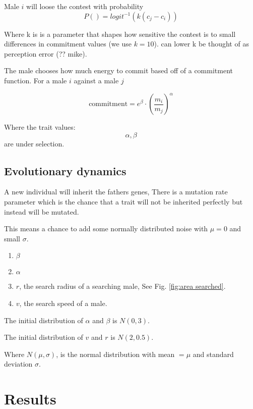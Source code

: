 \documentclass[a4paper,11pt]{article}
\newcommand{\myfigure}[4]{
\begin{figure}[h!]
    \centering
    \texttt{[image: \#1]}
    \caption{#2}
    \centering
    \texttt{[image: \#3]}
    \caption{#4}
\end{figure}
}
\begin{document}
Male $i$ will loose the contest with probability 
$$P(\text{})= logit^{-1}(k(c_j - c_i))$$

Where k is is a parameter that shapes how sensitive the contest is to small differences in commitment values (we use $k = 10$).
can lower k be thought of as perception error (?? mike).

The male chooses how much energy to commit based off of a commitment function. For a male $i$ against a male $j$

$$\text{commitment} = e^\beta \cdot (\frac{m_i}{m_j})^\alpha $$

Where the trait values:
$$\alpha , \beta$$
are under selection.

\clearpage

\subsection{Evolutionary dynamics}

A new individual will inherit the fathers genes,
There is a mutation rate parameter which is the chance that a trait will not be inherited perfectly but instead will be mutated.

This means a chance to add some normally distributed noise with $\mu = 0$ and small $\sigma$.


\begin{enumerate}
    \item $\beta$
    \item $\alpha$
    \item $r$, the search radius of a searching male, See Fig. \ref{fig:area searched}.
    \item $v$, the search speed of a male.
\end{enumerate}

The initial distribution of $\alpha$ and $\beta$ is $N(0, 3)$.

The initial distribution of $v$ and $r$ is $N(2, 0.5)$.

Where $N(\mu, \sigma)$, is the normal distribution with mean $= \mu$ and standard deviation $\sigma$.

\section{Results} %
\label{sec:results}

\end{document}
